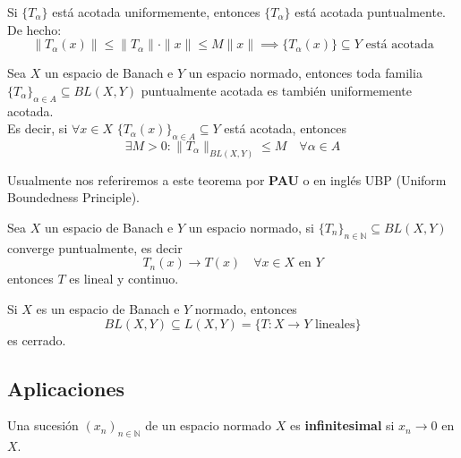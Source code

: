 \documentclass[12pt]{book}
\newcommand{\tbf}{\textbf}
\begin{document}
\begin{observacion}
    Si $\{T_\alpha\}$ está acotada uniformemente, entonces $\{T_\alpha\}$ está acotada puntualmente. De hecho:
    \begin{equation*}
        \|T_\alpha(x)\| \leq \|T_\alpha\| \cdot \|x\| \leq M \|x\| \implies \{T_\alpha(x)\} \subseteq Y \text{ está acotada}
    \end{equation*}
\end{observacion}


\begin{teo}
    Sea $X$ un espacio de Banach e $Y$ un espacio normado, entonces toda familia $\{T_\alpha\}_{\alpha \in A} \subseteq BL(X, Y)$ puntualmente acotada es también uniformemente acotada. \\
    \noindent
    Es decir, si $\forall x \in X$ $\{T_\alpha(x)\}_{\alpha \in A} \subseteq Y$ está acotada, entonces 
    $$\exists M > 0 : \|T_\alpha\|_{BL(X, Y)} \leq M \quad \forall \alpha \in A$$
\end{teo}

\begin{notacion}
    Usualmente nos referiremos a este teorema por \tbf{PAU} o en inglés UBP (Uniform Boundedness Principle).
\end{notacion}

\begin{coro}
    Sea $X$ un espacio de Banach e $Y$ un espacio normado, si $\{T_n\}_{n \in \mathbb{N}} \subseteq BL(X, Y)$ converge puntualmente, es decir
    \begin{equation*}
        T_n(x) \longrightarrow T(x) \quad \forall x \in X \text{ en } Y
    \end{equation*}
    entonces $T$ es lineal y continuo.
\end{coro}

\begin{coro}
    Si $X$ es un espacio de Banach e $Y$ normado, entonces 
    $$BL(X, Y) \subseteq L(X, Y) = \{ T: X \to Y \text{ lineales} \}$$ 
    es cerrado.
\end{coro}


\subsection{Aplicaciones}

\begin{definicion}
    Una sucesión $(x_n)_{n\in \mathbb{N}}$ de un espacio normado $X$ es \textbf{infinitesimal} si $x_n \to 0$ en $X$.
\end{definicion}
\end{document}
